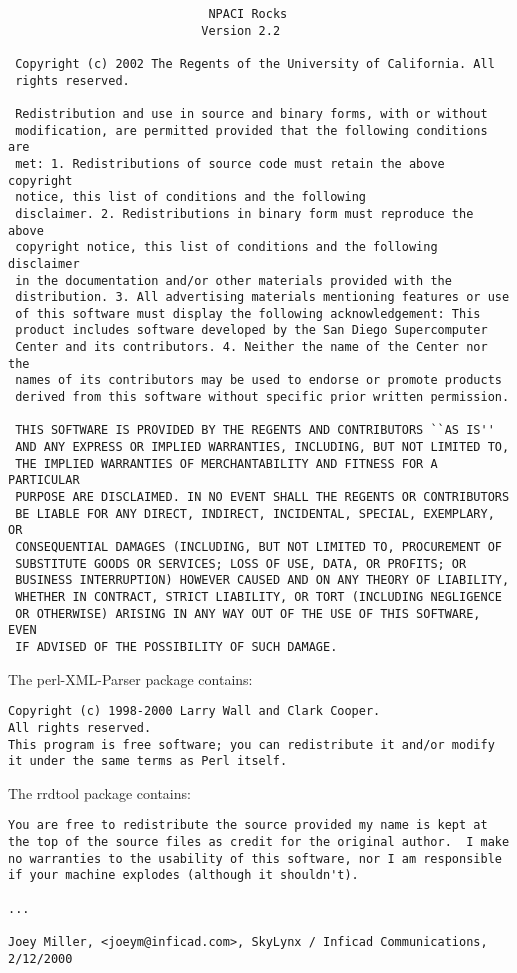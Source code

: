 \begin{verbatim}
                            NPACI Rocks
                           Version 2.2

 Copyright (c) 2002 The Regents of the University of California. All
 rights reserved.

 Redistribution and use in source and binary forms, with or without
 modification, are permitted provided that the following conditions are
 met: 1. Redistributions of source code must retain the above copyright
 notice, this list of conditions and the following
 disclaimer. 2. Redistributions in binary form must reproduce the above
 copyright notice, this list of conditions and the following disclaimer
 in the documentation and/or other materials provided with the
 distribution. 3. All advertising materials mentioning features or use
 of this software must display the following acknowledgement: This
 product includes software developed by the San Diego Supercomputer
 Center and its contributors. 4. Neither the name of the Center nor the
 names of its contributors may be used to endorse or promote products
 derived from this software without specific prior written permission.

 THIS SOFTWARE IS PROVIDED BY THE REGENTS AND CONTRIBUTORS ``AS IS''
 AND ANY EXPRESS OR IMPLIED WARRANTIES, INCLUDING, BUT NOT LIMITED TO,
 THE IMPLIED WARRANTIES OF MERCHANTABILITY AND FITNESS FOR A PARTICULAR
 PURPOSE ARE DISCLAIMED. IN NO EVENT SHALL THE REGENTS OR CONTRIBUTORS
 BE LIABLE FOR ANY DIRECT, INDIRECT, INCIDENTAL, SPECIAL, EXEMPLARY, OR
 CONSEQUENTIAL DAMAGES (INCLUDING, BUT NOT LIMITED TO, PROCUREMENT OF
 SUBSTITUTE GOODS OR SERVICES; LOSS OF USE, DATA, OR PROFITS; OR
 BUSINESS INTERRUPTION) HOWEVER CAUSED AND ON ANY THEORY OF LIABILITY,
 WHETHER IN CONTRACT, STRICT LIABILITY, OR TORT (INCLUDING NEGLIGENCE
 OR OTHERWISE) ARISING IN ANY WAY OUT OF THE USE OF THIS SOFTWARE, EVEN
 IF ADVISED OF THE POSSIBILITY OF SUCH DAMAGE.
\end{verbatim}
The perl-XML-Parser package contains:

\begin{verbatim}
Copyright (c) 1998-2000 Larry Wall and Clark Cooper.
All rights reserved.
This program is free software; you can redistribute it and/or modify
it under the same terms as Perl itself.
\end{verbatim}

The rrdtool package contains:

\begin{verbatim}
You are free to redistribute the source provided my name is kept at
the top of the source files as credit for the original author.  I make
no warranties to the usability of this software, nor I am responsible
if your machine explodes (although it shouldn't).

...

Joey Miller, <joeym@inficad.com>, SkyLynx / Inficad Communications,
2/12/2000
\end{verbatim}

